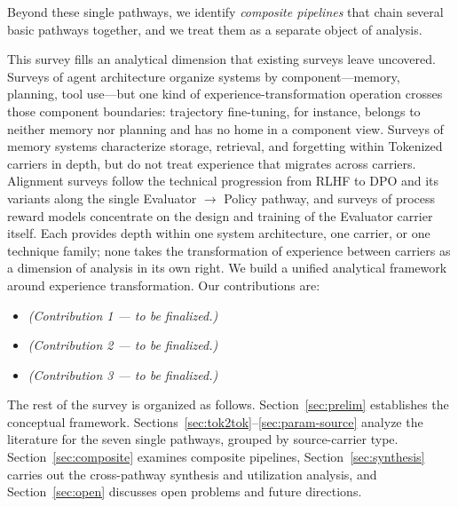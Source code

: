 Beyond these single pathways, we identify \emph{composite pipelines} that chain several basic pathways together, and we treat them as a separate object of analysis.

This survey fills an analytical dimension that existing surveys leave uncovered. Surveys of agent architecture organize systems by component---memory, planning, tool use---but one kind of experience-transformation operation crosses those component boundaries: trajectory fine-tuning, for instance, belongs to neither memory nor planning and has no home in a component view. Surveys of memory systems characterize storage, retrieval, and forgetting within Tokenized carriers in depth, but do not treat experience that migrates across carriers. Alignment surveys follow the technical progression from RLHF to DPO and its variants along the single Evaluator $\rightarrow$ Policy pathway, and surveys of process reward models concentrate on the design and training of the Evaluator carrier itself. Each provides depth within one system architecture, one carrier, or one technique family; none takes the transformation of experience between carriers as a dimension of analysis in its own right. We build a unified analytical framework around experience transformation. Our contributions are:
\begin{itemize}
  \item \emph{(Contribution 1 --- to be finalized.)}
  \item \emph{(Contribution 2 --- to be finalized.)}
  \item \emph{(Contribution 3 --- to be finalized.)}
\end{itemize}

The rest of the survey is organized as follows. Section~\ref{sec:prelim} establishes the conceptual framework. Sections~\ref{sec:tok2tok}--\ref{sec:param-source} analyze the literature for the seven single pathways, grouped by source-carrier type. Section~\ref{sec:composite} examines composite pipelines, Section~\ref{sec:synthesis} carries out the cross-pathway synthesis and utilization analysis, and Section~\ref{sec:open} discusses open problems and future directions.

